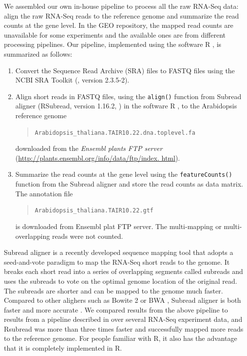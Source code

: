 \documentclass[letterpaper,12pt]{article}
\begin{document}
 
We assembled our own in-house pipeline to process all the raw RNA-Seq data:
align the raw RNA-Seq reads to the reference genome and summarize the read counts at the 
gene level. In the GEO repository, the
mapped read counts are unavailable for some experiments and the available ones
are from different processing pipelines.  
Our pipeline, implemented using the software R \citep{Rpackage}, is summarized as follows: 
\begin{enumerate}
    \item Convert the Sequence Read Archive (SRA) files to FASTQ files using the NCBI SRA Toolkit (\cite{leinonen2010sequence}, version 2.3.5-2). %
    \item
	Align short reads in FASTQ files,  using the \verb|align()| function from 
	Subread aligner (RSubread, version 1.16.2, \citealt{liao2013subread}) in the software R
	\citep{ Rpackage}, to the Arabidopsis reference genome
	   \begin{quote}
	   	\verb|Arabidopsis_thaliana.TAIR10.22.dna.toplevel.fa |
	   \end{quote} 
	downloaded from the \textit{ Ensembl plants FTP server} (\url{http://plants.ensembl.org/info/data/ftp/index. html}). 
	 


 \item
     Summarize the read counts at the gene level using the \verb|featureCounts()| function from the
     Subread aligner
     and store the read counts as data matrix.  
     The annotation file 
     \begin{quote}
     \verb"Arabidopsis_thaliana.TAIR10.22.gtf" 
 \end{quote}
     is
     downloaded from Ensembl plat FTP server. The multi-mapping or
     multi-overlapping  reads were not counted.  

\end{enumerate}
Subread aligner is a recently developed sequence mapping tool that adopts a
seed-and-vote paradigm to map the RNA-Seq short reads to the genome. 
It breaks each short read into a series of overlapping segments called
subreads and uses the subreads to vote on the optimal genome location of the
original read. The subreads are shorter and can be mapped to the genome much
faster.
Compared to other alighers such as Bowite 2 \citep{langmead2012fast} or BWA
\citep{li2009fast}, Subread aligner is both faster and more accurate
\citep{liao2013subread}. We compared results from the above
pipeline to results from a pipeline described in \cite{anders2013count} over several RNA-Seq experiment data, and Rsubread
was more than three times faster and successfully mapped more reads to the
reference genome.  For people familiar with R, it also has the advantage
that it is completely implemented in R.
\end{document}
